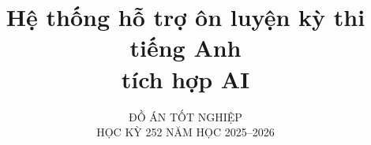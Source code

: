 \documentclass{hcmut-thesis}
\subtitle{ĐỒ ÁN TỐT NGHIỆP\\HỌC KỲ 252 NĂM HỌC 2025--2026}
\title{Hệ thống hỗ trợ ôn luyện kỳ thi tiếng Anh \\ tích hợp AI}
\begin{document}
\renewcommand{\chaptername}{CHƯƠNG}
\renewcommand{\contentsname}{Mục lục}
\renewcommand{\tablename}{Bảng}
\renewcommand{\figurename}{Hình}
\renewcommand{\listtablename}{Danh mục bảng biểu}
\renewcommand{\listfigurename}{Danh mục hình ảnh}

\hypersetup{pageanchor=false}
\coverpage%
\clearpage
\hypersetup{pageanchor=true}



\frontmatter%



%









\tableofcontents



\clearpage

\listoftables

\clearpage

\listoffigures





\mainmatter%



























\backmatter%





\nocite{*}

\clearpage
\appendix%

% 






\end{document}
